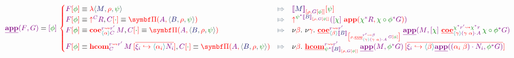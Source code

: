 \documentclass{article}
\newcommand\Eval[2]{
  \FmtFam{
    {\left\llbracket\FmtTm{#1}\right\rrbracket}_{\FmtVal{#2}}
  }
}
\begin{document}
\[
  \SemApp{F}{G}
  =
  \Fam{\phi}{
    \begin{cases}
      \Cond{
        \FamTest{F}{\phi}
        \equiv
        \VLam{
          \VClo{M}{\rho}{\psi}
        }
      }{
        \FamTest{
          \Eval{M}{\Squares*{\rho, \FamTest{G}{\phi}}}
        }{
          \psi
        }
      }
      \\
      \Cond{
        \FamTest{F}{\phi}
        \equiv
        \VUp{C}{R},
        \FamTest{C}{\RstId}\equiv \VPi{A}{\VClo{B}{\rho}{\psi}}
      }{
        \VUp{
          \Rst{\psi}{\Eval{B}{\Squares*{\rho,\FamTest{G}{\phi}}}}
        }{
          \Parens*{
            \Fam{\chi}{
              \VApp{
                \Rst{\chi}{R}
              }{
                \Rst{\chi\circ\phi}{G}
              }
            }
          }
        }
      }
      \\
      \Cond{
        \FamTest{F}{\phi}
        \equiv
        \VCoe{r}{r'}{
          \VAbs{\alpha}{C}
        }{M},
        \FamTest{C}{\RstId}\equiv \VPi{A}{\VClo{B}{\rho}{\psi}}
      }{
        \Fresh{\beta}{
          \Fresh{\gamma}{
            \SemCoe{r}{r'}{
              \VAbs{\beta}{
                \Eval{B}{
                  \Squares*{
                    \rho,
                    \SemCoe{r'}{\beta}{
                      \VAbs{\gamma}{
                        \Act{\Swap{\gamma}{\alpha}}{A}
                      }
                    }{
                      \FamTest{G}{\phi}
                    }
                  }
                }
              }
            }{
              \SemApp{M}{
                \Fam{\chi}{
                  \SemCoe{
                    \Rst{\chi}{r'}
                  }{
                    \Rst{\chi}{r}
                  }{
                    \VAbs{\gamma}{
                      \Act{\Swap{\gamma}{\alpha}}{A}
                    }
                  }{
                    \Rst{\chi\circ\phi}{G}
                  }
                }
              }
            }
          }
        }
      }
      \\
      \Cond{
        \FamTest{F}{\phi}
        \equiv
        \VHCom{r}{r'}{C}{M}{
          \Vec{
            \VFace{\xi_i}{
              \VAbs{\alpha_i}{N_i}
            }
          }
        },
        \FamTest{C}{\RstId}\equiv
        \VPi{A}{\VClo{B}{\rho}{\psi}}
      }{
        \Fresh{\beta}{
          \SemHCom{r}{r'}{
            \Rst{\psi}{\Eval{B}{\Squares*{\rho,\FamTest{G}{\phi}}}}
          }{
            \SemApp{M}{\Rst{\phi}{G}}
          }{
            \Vec{
              \VFace{\xi_i}{
                \VAbs{\beta}{
                  \SemApp{
                    \Act{
                      \Swap{\alpha_i}{\beta}
                    }{N_i}
                  }{
                    \Rst{\phi}{G}
                  }
                }
              }
            }
          }
        }
      }
    \end{cases}
  }
\]
\end{document}
